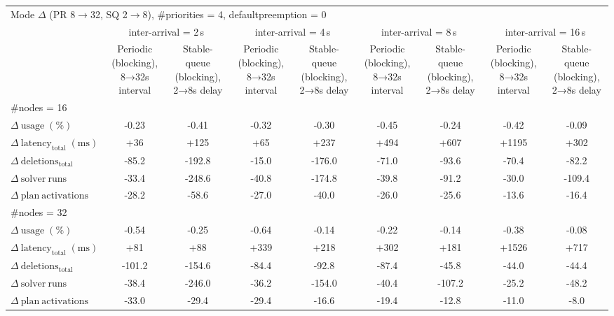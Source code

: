 
\begin{tabular}{l c c c c c c c c}
\toprule
\multicolumn{9}{l}{Mode $\Delta$ (PR 8$\rightarrow$32, SQ 2$\rightarrow$8), \#priorities = 4, defaultpreemption = 0} \\
\addlinespace[0.2em]
 & \multicolumn{2}{c}{inter-arrival = 2\,s} & \multicolumn{2}{c}{inter-arrival = 4\,s} & \multicolumn{2}{c}{inter-arrival = 8\,s} & \multicolumn{2}{c}{inter-arrival = 16\,s} \\
\cmidrule(lr){2-3}\cmidrule(lr){4-5}\cmidrule(lr){6-7}\cmidrule(lr){8-9}
 & Periodic (blocking), 8→32s interval & Stable-queue (blocking), 2→8s delay & Periodic (blocking), 8→32s interval & Stable-queue (blocking), 2→8s delay & Periodic (blocking), 8→32s interval & Stable-queue (blocking), 2→8s delay & Periodic (blocking), 8→32s interval & Stable-queue (blocking), 2→8s delay \\
\midrule
\multicolumn{9}{l}{\#nodes = 16} \\
\midrule
$\Delta\ \mathrm{usage}\;(\%)$ & -0.23 & -0.41 & -0.32 & -0.30 & -0.45 & -0.24 & -0.42 & -0.09 \\
$\Delta\ \mathrm{latency}_{\mathrm{total}}\;(\mathrm{ms})$ & +36 & +125 & +65 & +237 & +494 & +607 & +1195 & +302 \\
$\Delta\ \mathrm{deletions}_{\mathrm{total}}$ & -85.2 & -192.8 & -15.0 & -176.0 & -71.0 & -93.6 & -70.4 & -82.2 \\
$\Delta\ \mathrm{solver\ runs}$ & -33.4 & -248.6 & -40.8 & -174.8 & -39.8 & -91.2 & -30.0 & -109.4 \\
$\Delta\ \mathrm{plan\ activations}$ & -28.2 & -58.6 & -27.0 & -40.0 & -26.0 & -25.6 & -13.6 & -16.4 \\
\midrule
\multicolumn{9}{l}{\#nodes = 32} \\
\midrule
$\Delta\ \mathrm{usage}\;(\%)$ & -0.54 & -0.25 & -0.64 & -0.14 & -0.22 & -0.14 & -0.38 & -0.08 \\
$\Delta\ \mathrm{latency}_{\mathrm{total}}\;(\mathrm{ms})$ & +81 & +88 & +339 & +218 & +302 & +181 & +1526 & +717 \\
$\Delta\ \mathrm{deletions}_{\mathrm{total}}$ & -101.2 & -154.6 & -84.4 & -92.8 & -87.4 & -45.8 & -44.0 & -44.4 \\
$\Delta\ \mathrm{solver\ runs}$ & -38.4 & -246.0 & -36.2 & -154.0 & -40.4 & -107.2 & -25.2 & -48.2 \\
$\Delta\ \mathrm{plan\ activations}$ & -33.0 & -29.4 & -29.4 & -16.6 & -19.4 & -12.8 & -11.0 & -8.0 \\
\bottomrule
\end{tabular}

